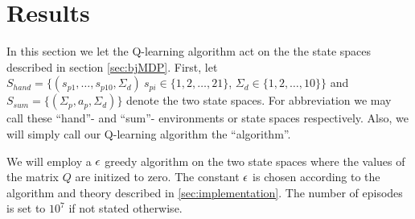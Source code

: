 \section{Results}
In this section we let the Q-learning algorithm act on the the state spaces described in section \ref{sec:bjMDP}. First, let $S_{hand}=\{  (s_{p1},\ldots,s_{p10},\Sigma_{d})\ s_{pi} \in \{1,2,\ldots, 21 \}$, $\Sigma_{d}\in \{1,2,\ldots, 10 \} \}$ and $S_{sum}=\{  (\Sigma_p, a_p, \Sigma_d )  \}$ denote the two state spaces. For abbreviation we may call these ``hand''- and ``sum''- environments or state spaces respectively. Also, we will simply call our Q-learning algorithm the ``algorithm''.

We will employ a $\epsilon$ greedy algorithm on the two state spaces where the values of the matrix $Q$ are initized to zero. The constant $\epsilon$ is chosen according to the algorithm and theory described in \ref{sec:implementation}. The number of episodes is set to $10^7$ if not stated otherwise. 


